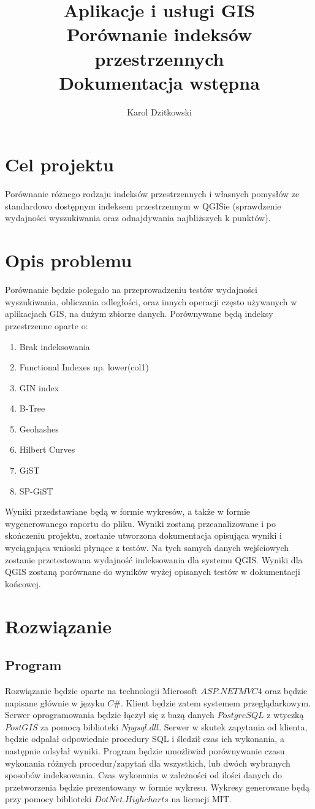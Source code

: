 \documentclass[11pt,a4paper]{article}
\author{Karol Dzitkowski}
\title{
	Aplikacje i usługi GIS\\
	\huge{Porównanie indeksów przestrzennych}\\
 	Dokumentacja wstępna
 }
\begin{document}
\maketitle
\newpage

\tableofcontents
\newpage

\section{Cel projektu}
Porównanie różnego rodzaju indeksów przestrzennych i własnych pomysłów ze standardowo dostępnym indeksem przestrzennym w QGISie
(sprawdzenie wydajności wyszukiwania oraz odnajdywania najbliższych k punktów).
\section{Opis problemu}
Porównanie będzie polegało na przeprowadzeniu testów wydajności wyszukiwania, obliczania odległości, oraz innych operacji często
używanych w aplikacjach GIS, na dużym zbiorze danych. Porównywane będą indeksy przestrzenne oparte o:
\begin{enumerate}
	\item Brak indeksowania
	\item Functional Indexes np. lower(col1)
	\item GIN index
	\item B-Tree
	\item Geohashes
	\item Hilbert Curves
	\item GiST
	\item SP-GiST
\end{enumerate}
Wyniki przedstawiane będą w formie wykresów, a także w formie wygenerowanego raportu do pliku. Wyniki zostaną przeanalizowane i
po skończeniu projektu, zostanie utworzona dokumentacja opisująca wyniki i wyciągająca wnioski płynące z testów. Na tych samych danych
wejściowych zostanie przetestowana wydajność indeksowania dla systemu QGIS. Wyniki dla QGIS zostaną porównane do wyników wyżej opisanych 
testów w dokumentacji końcowej.
\section{Rozwiązanie}
\subsection{Program}
Rozwiązanie będzie oparte na technologii Microsoft $ASP.NET MVC4$ oraz będzie napisane głównie w języku $C\#$. Klient będzie zatem
systemem przeglądarkowym. Serwer oprogramowania będzie łączył się z bazą danych $PostgreSQL$ z wtyczką $PostGIS$ za pomocą biblioteki 
$Npgsql.dll$. Serwer w skutek zapytania od klienta, będzie odpalał odpowiednie procedury SQL i śledził czas ich wykonania, a następnie odsyłał wyniki. 
Program będzie umożliwiał porównywanie czasu wykonania różnych procedur/zapytań dla wszystkich, lub dwóch wybranych sposobów 
indeksowania. Czas wykonania w zależności od ilości danych do przetworzenia będzie prezentowany w formie wykresu. Wykresy 
generowane będą przy pomocy biblioteki $DotNet.Highcharts$ na licencji MIT.
\end{document}

